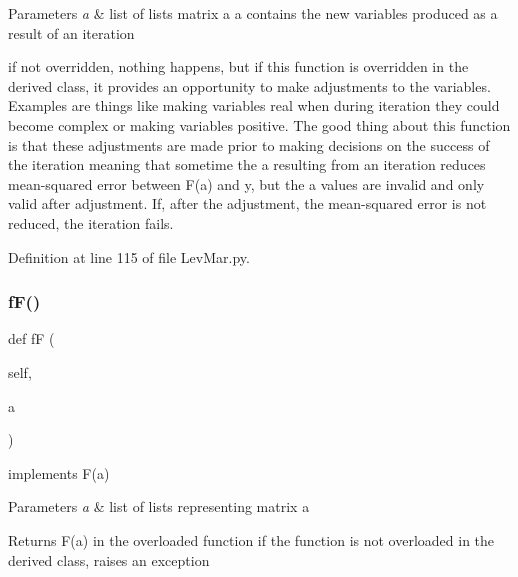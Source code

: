 \begin{DoxyParams}{Parameters}
{\em a} & list of lists matrix a a contains the new variables produced as a result of an iteration\\
\hline
\end{DoxyParams}
if not overridden, nothing happens, but if this function is overridden in the derived class, it provides an opportunity to make adjustments to the variables. Examples are things like making variables real when during iteration they could become complex or making variables positive. The good thing about this function is that these adjustments are made prior to making decisions on the success of the iteration meaning that sometime the a resulting from an iteration reduces mean-\/squared error between F(a) and y, but the a values are invalid and only valid after adjustment. If, after the adjustment, the mean-\/squared error is not reduced, the iteration fails. 

Definition at line 115 of file Lev\+Mar.\+py.

\mbox{\label{classSignalIntegrity_1_1Fit_1_1LevMar_1_1LevMar_a4657ab652abd49c90e9541299fa5e9d8}} 
\subsubsection{\texorpdfstring{f\+F()}{fF()}}
{\footnotesize\ttfamily def fF (\begin{DoxyParamCaption}\item[{}]{self,  }\item[{}]{a }\end{DoxyParamCaption})}



implements F(a) 


\begin{DoxyParams}{Parameters}
{\em a} & list of lists representing matrix a \\
\hline
\end{DoxyParams}
\begin{DoxyReturn}{Returns}
F(a) in the overloaded function if the function is not overloaded in the derived class, raises an exception 
\end{DoxyReturn}

